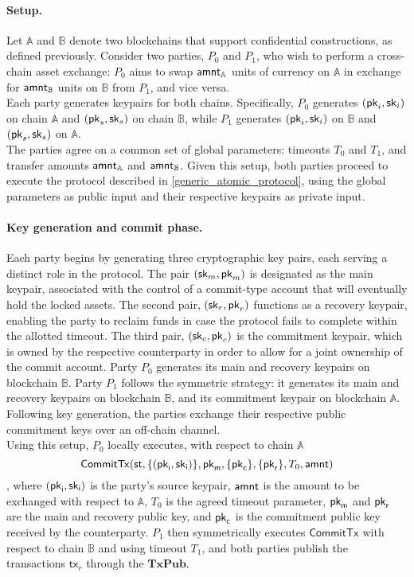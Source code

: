 \paragraph*{Setup.} Let $\mathbb{A}$ and $\mathbb{B}$ denote two blockchains that support confidential constructions, as defined previously. Consider two parties, $P_0$ and $P_1$, who wish to perform a cross-chain asset exchange: $P_0$ aims to swap $\mathsf{amnt}_\mathbb{A}$ units of currency on $\mathbb{A}$ in exchange for $\mathsf{amnt}_\mathbb{B}$ units on $\mathbb{B}$ from $P_1$, and vice versa. \\
Each party generates keypairs for both chains. Specifically, $P_0$ generates $(\mathsf{pk}_i, \mathsf{sk}_i)$ on chain $\mathbb{A}$ and $(\mathsf{pk}_s, \mathsf{sk}_s)$ on chain $\mathbb{B}$, while $P_1$ generates $(\mathsf{pk}_i, \mathsf{sk}_i)$ on $\mathbb{B}$ and $(\mathsf{pk}_s, \mathsf{sk}_s)$ on $\mathbb{A}$. \\
The parties agree on a common set of global parameters: timeouts $T_0$ and $T_1$, and transfer amounts $\mathsf{amnt}_\mathbb{A}$ and $\mathsf{amnt}_\mathbb{B}$. Given this setup, both parties proceed to execute the protocol described in \cref{generic_atomic_protocol}, using the global parameters as public input and their respective keypairs as private input.
\paragraph*{Key generation and commit phase.} 
Each party begins by generating three cryptographic key pairs, each serving a distinct role in the protocol. The pair $(\mathsf{sk}_m, \mathsf{pk}_m)$ is designated as the main keypair, associated with the control of a commit-type account that will eventually hold the locked assets. The second pair, $(\mathsf{sk}_r, \mathsf{pk}_r)$ functions as a recovery keypair, enabling the party to reclaim funds in case the protocol fails to complete within the allotted timeout. The third pair, $(\mathsf{sk}_c, \mathsf{pk}_c)$ is the commitment keypair, which is owned by the respective counterparty in order to allow for a joint ownership of the commit account. Party $P_0$ generates its main and recovery keypairs on blockchain $\mathbb{B}$. Party $P_1$ follows the symmetric strategy: it generates its main and recovery keypairs on blockchain $\mathbb{B}$, and its commitment keypair on blockchain $\mathbb{A}$. Following key generation, the parties exchange their respective public commitment keys over an off-chain channel. \\
Using this setup, $P_0$ locally executes, with respect to chain $\mathbb{A}$ \[\mathsf{CommitTx}(\st, \{ (\pki, \ski) \}, \pkm , \{ \pkc \}, \{ \pkr \}, T_0, \amnt)\], where $(\mathsf{pk}_{\mathsf{i}}, \mathsf{sk}_{\mathsf{i}})$ is the party's source keypair, $\mathsf{amnt}$ is the amount to be exchanged with respect to $\mathbb{A}$, $T_0$ is the agreed timeout parameter, $\mathsf{pk}_{\mathsf{m}}$ and $\mathsf{pk}_{\mathsf{r}}$ are the main and recovery public key, and $\mathsf{pk}_{\mathsf{c}}$ is the commitment public key received by the counterparty. $P_1$ then symmetrically executes $\mathsf{CommitTx}$ with respect to chain $\mathbb{B}$ and using timeout $T_1$, and both parties publish the transactions $\mathsf{tx}_r$ through the $\mathbf{TxPub}$.
